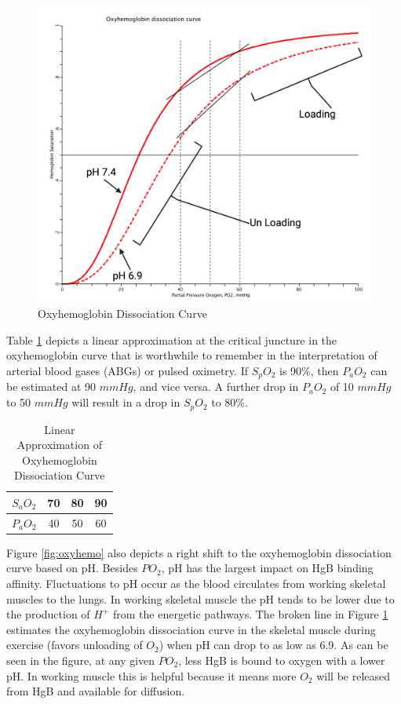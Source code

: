 \begin{figure}[!h]
    \centering
    \includegraphics[width=1.0\linewidth]{./figure/oxyhemo1.png}
    \caption{Oxyhemoglobin Dissociation Curve}
    \label{fig:oxyhemo1}
\end{figure}

Table \ref{table:oxyhemo} depicts a linear approximation at the critical juncture in the oxyhemoglobin curve that is worthwhile to remember in the interpretation of arterial blood gases (ABGs) or pulsed oximetry. If $S_pO_2$ is 90\%, then $P_aO_2$ can be estimated at 90 $mmHg$, and vice versa. A further drop in $P_aO_2$ of 10 $mmHg$ to 50 $mmHg$ will result in a drop in $S_pO_2$ to 80\%.

\begin{table}[h!]
\centering
\begin{tabular}{||c|c|c|c||} 
 \hline
 $S_aO_2$ & 70 & 80 & 90 \\ 
 \hline
 $P_aO_2$ & 40 & 50 & 60 \\[1ex] 
 \hline
\end{tabular}
\caption{Linear Approximation of Oxyhemoglobin Dissociation Curve}
\label{table:oxyhemo}
\end{table}

Figure \ref{fig:oxyhemo} also depicts a right shift to the oxyhemoglobin dissociation curve based on pH. Besides $PO_2$, pH has the largest impact on HgB binding affinity. Fluctuations to pH occur as the blood circulates from working skeletal muscles to the lungs. In working skeletal muscle the pH tends to be lower due to the production of $H^+$ from the energetic pathways. The broken line in Figure \ref{fig:oxyhemo1} estimates the oxyhemoglobin dissociation curve in the skeletal muscle during exercise (favors unloading of $O_2$) when pH can drop to as low as 6.9. As can be seen in the figure, at any given $PO_2$, less HgB is bound to oxygen with a lower pH. In working muscle this is helpful because it means more $O_2$ will be released from HgB and available for diffusion.


